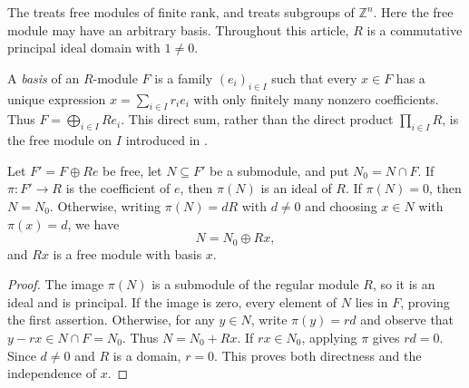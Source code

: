 The  treats free modules of finite rank, and  treats subgroups of $\mathbb Z^n$. Here the free module may have an arbitrary basis. Throughout this article, $R$ is a commutative principal ideal domain with $1\ne0$.

\begin{definition}\label{def-basis-of-free-module}
A \emph{basis} of an $R$-module $F$ is a family $(e_i)_{i\in I}$ such that every $x\in F$ has a unique expression $x=\sum_{i\in I}r_ie_i$ with only finitely many nonzero coefficients. Thus $F=\bigoplus_{i\in I}Re_i$. This direct sum, rather than the direct product $\prod_{i\in I}R$, is the free module on $I$ introduced in .
\end{definition}

\begin{lemma}\label{lem-successor-coordinate-splitting}
Let $F'=F\oplus Re$ be free, let $N\subseteq F'$ be a submodule, and put $N_0=N\cap F$. If $\pi:F'\to R$ is the coefficient of $e$, then $\pi(N)$ is an ideal of $R$. If $\pi(N)=0$, then $N=N_0$. Otherwise, writing $\pi(N)=dR$ with $d\ne0$ and choosing $x\in N$ with $\pi(x)=d$, we have
\[
N=N_0\oplus Rx,
\]
and $Rx$ is a free module with basis $x$.
\end{lemma}
\begin{proof}\label{proof-successor-coordinate-splitting}
The image $\pi(N)$ is a submodule of the regular module $R$, so it is an ideal and is principal. If the image is zero, every element of $N$ lies in $F$, proving the first assertion. Otherwise, for any $y\in N$, write $\pi(y)=rd$ and observe that $y-rx\in N\cap F=N_0$. Thus $N=N_0+Rx$. If $rx\in N_0$, applying $\pi$ gives $rd=0$. Since $d\ne0$ and $R$ is a domain, $r=0$. This proves both directness and the independence of $x$.
\end{proof}

